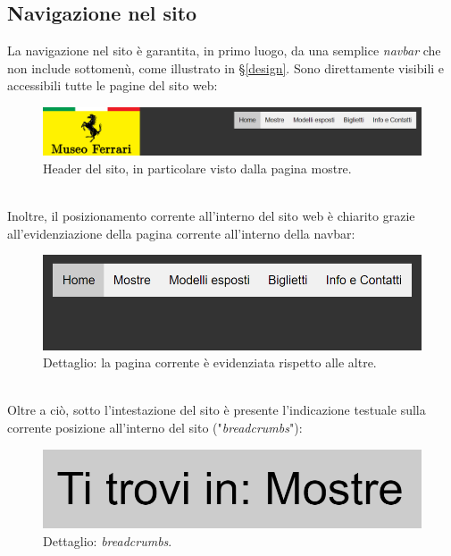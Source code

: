 \subsection{Navigazione nel sito}
La navigazione nel sito è garantita, in primo luogo, da una semplice \textit{navbar} che non include sottomenù, come illustrato in §\ref{design}. Sono direttamente visibili e accessibili tutte le pagine del sito web:
\begin{figure}[h]
		\begin{center}
		\includegraphics[scale=1.312]{Images/headerSito.png}
		\caption{Header del sito, in particolare visto dalla pagina mostre.}
	\end{center}
\end{figure}\\
Inoltre, il posizionamento corrente all'interno del sito web è chiarito grazie all'evidenziazione della pagina corrente all'interno della navbar:
\begin{figure}[h]
	\begin{center}
		\includegraphics[scale=1.312]{Images/selezionePaginaCorrente.png}
		\caption{Dettaglio: la pagina corrente è evidenziata rispetto alle altre.}
	\end{center}
\end{figure}\\
Oltre a ciò, sotto l'intestazione del sito è presente l'indicazione testuale sulla corrente posizione all'interno del sito ("\textit{breadcrumbs}"):
\begin{figure}[h]
	\begin{center}
		\includegraphics[scale=0.6]{Images/breadcrumbs.png}
		\caption{Dettaglio: \textit{breadcrumbs}.}
	\end{center}
\end{figure}\\

